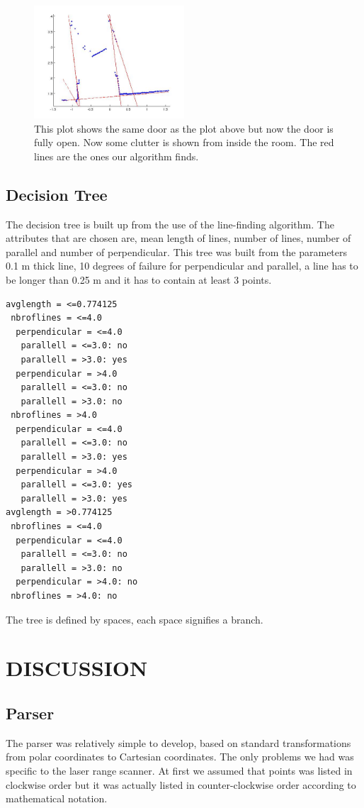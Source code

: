 \documentclass[a4paper, 10pt, conference]{ieeeconf}      %
\begin{document}
\begin{figure}
\centering
\includegraphics[width=0.5\textwidth]{presimg/doorfullines.jpg}
\caption{This plot shows the same door as the plot above but now the door is fully open. Now some clutter is shown from inside the room. The red lines are the ones our algorithm finds.}
\label{doorfull}
\end{figure}

\subsection{Decision Tree}
The decision tree is built up from the use of the line-finding algorithm. The attributes that are chosen are, mean length of lines, number of lines, number of parallel and number of perpendicular. This tree was built from the parameters 0.1 m thick line, 10 degrees of failure for perpendicular and parallel, a line has to be longer than 0.25 m and it has to contain at least 3 points.

\begin{lstlisting}
avglength = <=0.774125
 nbroflines = <=4.0
  perpendicular = <=4.0
   parallell = <=3.0: no
   parallell = >3.0: yes
  perpendicular = >4.0
   parallell = <=3.0: no
   parallell = >3.0: no
 nbroflines = >4.0
  perpendicular = <=4.0
   parallell = <=3.0: no
   parallell = >3.0: yes
  perpendicular = >4.0
   parallell = <=3.0: yes
   parallell = >3.0: yes
avglength = >0.774125
 nbroflines = <=4.0
  perpendicular = <=4.0
   parallell = <=3.0: no
   parallell = >3.0: no
  perpendicular = >4.0: no
 nbroflines = >4.0: no

\end{lstlisting}

The tree is defined by spaces, each space signifies a branch.

\section{DISCUSSION}

\subsection{Parser}
The parser was relatively simple to develop, based on standard transformations from polar coordinates to Cartesian coordinates. The only problems we had was specific to the laser range scanner. At first we assumed that points was listed in clockwise order but it was actually listed in counter-clockwise order according to mathematical notation.
\end{document}
